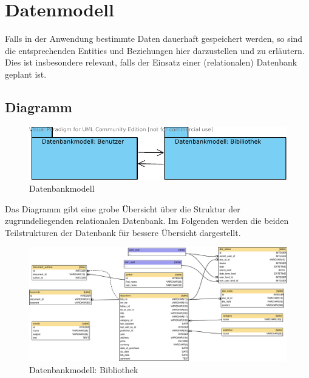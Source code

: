 \chapter{Datenmodell}
\label{kap4}
Falls in der Anwendung bestimmte Daten dauerhaft gespeichert werden, so sind
die entsprechenden Entities und Beziehungen hier darzustellen und zu erläutern.
Dies ist insbesondere relevant, falls der Einsatz einer (relationalen)
Datenbank geplant ist.

\section{Diagramm}


\begin{figure}[H]
\includegraphics[width=1.0\linewidth]{bilder/db_wirelib-packages.pdf}
\caption{Datenbankmodell}
\label{fig:DBDiagramm}
\end{figure}

Das Diagramm gibt eine grobe Übersicht über die Struktur der zugrundeliegenden
relationalen Datenbank. Im Folgenden werden die beiden Teilstrukturen der
Datenbank für bessere Übersicht dargestellt.

\begin{figure}[H]
\includegraphics[width=1.0\linewidth]{bilder/database-wirelib_cluster-doc.pdf}
\caption{Datenbankmodell: Bibliothek}
\label{fig:DB_docDiagramm}
\end{figure}

